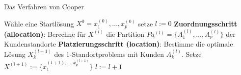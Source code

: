             \begin{algorithm}[H]
          \begin{algorithmic}[1]
            \caption{Das Verfahren von Cooper}
            \State Wähle eine Startlösung $X^{0} = {x_1^{(0)}, \dots, x_p^{(0)}}$ setze $l := 0$
              \State \textbf{Zuordnungsschritt (allocation)}: Berechne für $X^{(l)}$ die Partition $Pa^{(l)} = \{A_1^{(l)}, \dots, A_p^{(l)}\}$ der Kundenstandorte
              \State \textbf{Platzierungsschritt (location)}: Bestimme die optimale Lösung $X_k^{(l+1)}$ des 1-Standortproblems mit Kunden $A_k^{(l)}$. Setze $X^{(l+1)}:= \{x_1^{(l+1), \dots, x_p^{(l+1)}}\}$
              \State $l:=l+1$
            \EndWhile
            \end{algorithmic}
        \end{algorithm}




        





